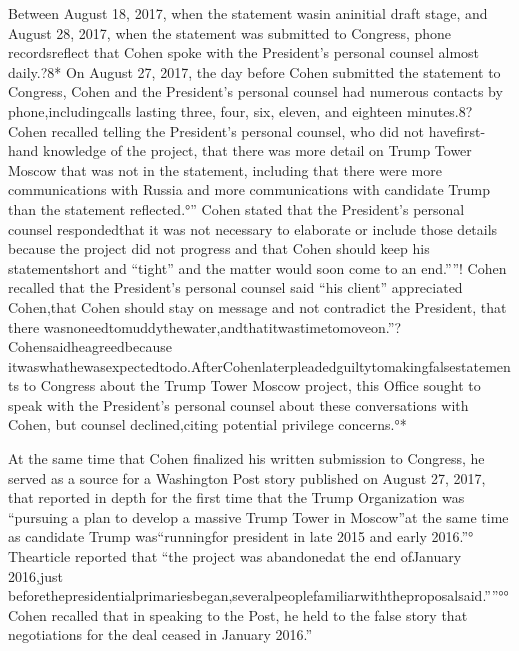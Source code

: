 Between August 18, 2017, when the statement wasin aninitial draft stage, and August 28, 2017, when the statement was submitted to Congress, phone recordsreflect that Cohen spoke with the President’s personal counsel almost daily.?8* On August 27, 2017, the day before Cohen submitted the statement to Congress, Cohen and the President’s personal counsel had numerous contacts by phone,includingcalls lasting three, four, six, eleven, and eighteen minutes.8? Cohen recalled telling the President’s personal counsel, who did not havefirst-hand knowledge of the project, that there was more detail on Trump Tower Moscow that was not in the statement, including that there were more communications with Russia and more communications with candidate Trump than the statement reflected.°” Cohen stated that the President’s personal counsel respondedthat it was not necessary to elaborate or include those details because the project did not progress and that Cohen should keep his statementshort and “tight” and the matter would soon come to an end.””! Cohen recalled that the President’s personal counsel said “his client” appreciated Cohen,that Cohen should stay on message and not contradict the President, that there wasnoneedtomuddythewater,andthatitwastimetomoveon.”? Cohensaidheagreedbecause itwaswhathewasexpectedtodo.AfterCohenlaterpleadedguiltytomakingfalsestatements to Congress about the Trump Tower Moscow project, this Office sought to speak with the President’s personal counsel about these conversations with Cohen, but counsel declined,citing potential privilege concerns.°*

At the same time that Cohen finalized his written submission to Congress, he served as a source for a Washington Post story published on August 27, 2017, that reported in depth for the first time that the Trump Organization was “pursuing a plan to develop a massive Trump Tower in Moscow”at the same time as candidate Trump was“runningfor president in late 2015 and early 2016.”° Thearticle reported that “the project was abandonedat the end ofJanuary 2016,just beforethepresidentialprimariesbegan,severalpeoplefamiliarwiththeproposalsaid.””°° Cohen recalled that in speaking to the Post, he held to the false story that negotiations for the deal ceased in January 2016.”

